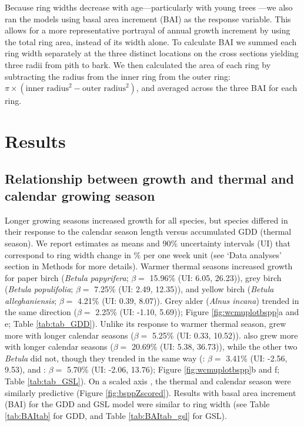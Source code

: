 \documentclass{article}\usepackage[]{graphicx}\usepackage[]{xcolor}
\begin{document}
Because ring widths decrease with age---particularly with young trees \citep{fritts_dendroecology_1989}---we also ran the models using basal area increment (BAI) as the response variable. This allows for a more representative portrayal of annual growth increment by using the total ring area, instead of its width alone. To calculate BAI we summed each ring width separately at the three distinct locations on the cross sections yielding three radii from pith to bark. We then calculated the area of each ring by subtracting the radius from the inner ring from the outer ring: $\pi \times (\text{inner radius}^2 - \text{outer radius}^2)$, and averaged across the three BAI for each ring. 


\section{Results}

\subsection*{Relationship between growth and thermal and calendar growing season}
Longer growing seasons increased growth for all species, but species differed in their response to the calendar season length versus accumulated GDD (thermal season). We report estimates as means and 90\% uncertainty intervals (UI) that correspond to ring width change in \% per one week unit (see `Data analyses' section in Methods for more details).
Warmer thermal seasons increased growth for paper birch (\textit{Betula papyrifera}; $\beta =$
15.96\% (UI: 6.05, 26.23)), grey birch (\textit{Betula populifolia}; $\beta =$
7.25\% (UI: 2.49, 12.35)), and yellow birch (\textit{Betula alleghaniensis}; $\beta =$
4.21\% (UI: 0.39, 8.07)). Grey alder (\textit{Alnus incana}) trended in the same direction ($\beta =$ 
2.25\% (UI: -1.10, 5.69)); Figure \ref{fig:wcmuplotbspp}a and e; Table \ref{tab:tab_GDD}).
Unlike its response to warmer thermal season, {\Ainc} grew more with longer calendar seasons ($\beta =$
5.25\% (UI: 0.33, 10.52)). {\Bpap} also grew more with longer calendar seasons ($\beta =$ 
20.69\% (UI: 5.38, 36.73)), while the other two \textit{Betula} did not, though they trended in the same way ({\Ball}: $\beta =$
3.41\% (UI: -2.56, 9.53), and {\Bpop}: $\beta =$
5.70\% (UI: -2.06, 13.76); Figure \ref{fig:wcmuplotbspp}b and f; Table \ref{tab:tab_GSL}). 
On a scaled axis \citep[through $z$-scoring,][]{gelman_data_2006}, the thermal and calendar season were similarly predictive (Figure \ref{fig:bsppZscored}). Results with basal area increment (BAI) for the GDD and GSL model were similar to ring width (see Table \ref{tab:BAItab} for GDD, and Table \ref{tab:BAItab_gsl} for GSL).
\end{document}
